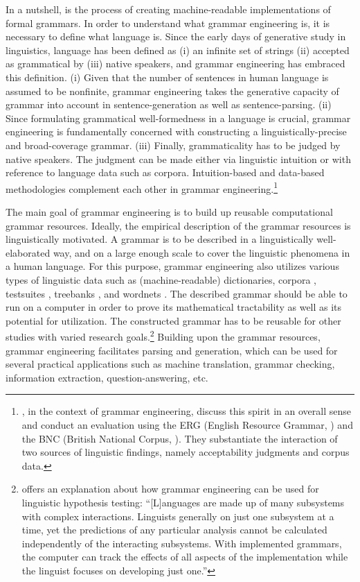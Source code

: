 In a nutshell,  is the process of creating
machine-readable implementations of formal grammars. In order to
understand what grammar engineering is, it is necessary to define what
language is.  Since the early days of generative study in linguistics,
language has been defined as (i) an infinite set of strings
(ii) accepted as grammatical by (iii) native speakers, and grammar
engineering has embraced this definition.  (i) Given that the number
of sentences in human language is assumed to be nonfinite, grammar
engineering takes the generative capacity of grammar into account in
sentence-generation as well as sentence-parsing. (ii) Since formulating
grammatical well-formedness in a language is crucial, grammar engineering is
fundamentally concerned with constructing a linguistically-precise and
broad-coverage grammar. (iii) Finally, grammaticality has to be judged
by native speakers. The judgment can be made either via linguistic
intuition or with reference to language data such as corpora.
Intuition-based and data-based methodologies complement each other in
grammar engineering.\footnote{\citet{balwin:etal:05}, in the context
  of grammar engineering, discuss this spirit in an overall sense and
  conduct an evaluation using the ERG (English Resource Grammar,
  \citealt{flickinger:00}) and the BNC (British National Corpus,
  \citealt{burnard:00}). They substantiate the interaction of two
  sources of linguistic findings, namely acceptability judgments and
  corpus data.}




The main goal of grammar engineering is to build up reusable
computational grammar resources. Ideally, the
empirical description of the grammar resources is linguistically
motivated. A grammar is to be described in a linguistically
well-elaborated way, and on a large enough scale to cover the
linguistic phenomena in a human language.  For this purpose, grammar
engineering also utilizes various types of linguistic data such as
(machine-readable) dictionaries, corpora
\citep{nichols:etal:10,song:etal:10}, testsuites \citep{oepen:01},
treebanks \citep{oepen:etal:04,bond:etal:06}, and wordnets
\citep{bond:etal:09,pozen:13}.  The described grammar should be able
to run on a computer in order to prove its mathematical tractability
as well as its potential for utilization. The constructed grammar has
to be reusable for other studies with varied research
goals.\footnote{\citet[16]{bender:08} offers an explanation about how
  grammar engineering can be used for linguistic hypothesis testing:
  ``[L]anguages are made up of many subsystems with complex
  interactions. Linguists generally  on just one subsystem
  at a time, yet the predictions of any particular analysis cannot be
  calculated independently of the interacting subsystems. With
  implemented grammars, the computer can track the effects of all
  aspects of the implementation while the linguist focuses on
  developing just one.''} Building upon the grammar resources, grammar
engineering facilitates parsing and generation, which can be used for
several practical applications such as machine translation, grammar
checking, information extraction, question-answering, etc.




